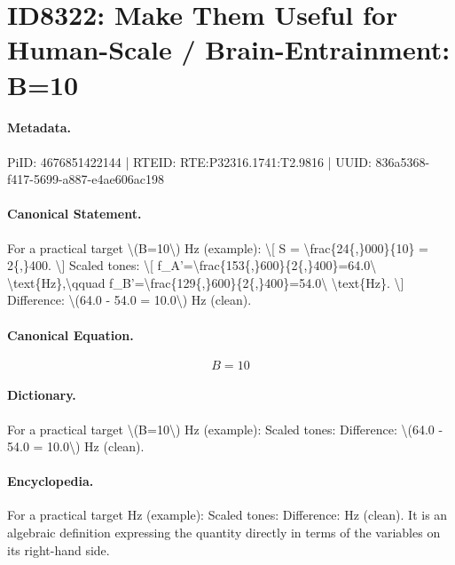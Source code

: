 \section*{ID8322: Make Them Useful for Human-Scale / Brain-Entrainment: B=10}
\paragraph{Metadata.}
PiID: 4676851422144 | RTEID: RTE:P32316.1741:T2.9816 | UUID: 836a5368-f417-5699-a887-e4ae606ac198

\paragraph{Canonical Statement.}
For a practical target \textbackslash{}(B=10\textbackslash{}) Hz (example): \textbackslash{}[ S = \textbackslash{}frac\{24\{,\}000\}\{10\} = 2\{,\}400. \textbackslash{}] Scaled tones: \textbackslash{}[ f\_A'=\textbackslash{}frac\{153\{,\}600\}\{2\{,\}400\}=64.0\textbackslash{} \textbackslash{}text\{Hz\},\textbackslash{}qquad f\_B'=\textbackslash{}frac\{129\{,\}600\}\{2\{,\}400\}=54.0\textbackslash{} \textbackslash{}text\{Hz\}. \textbackslash{}] Difference: \textbackslash{}(64.0 - 54.0 = 10.0\textbackslash{}) Hz (clean).

\paragraph{Canonical Equation.}
\[
B=10
\]

\paragraph{Dictionary.}
For a practical target \textbackslash{}(B=10\textbackslash{}) Hz (example): Scaled tones: Difference: \textbackslash{}(64.0 - 54.0 = 10.0\textbackslash{}) Hz (clean).

\paragraph{Encyclopedia.}
For a practical target Hz (example): Scaled tones: Difference: Hz (clean). It is an algebraic definition expressing the quantity directly in terms of the variables on its right-hand side.
